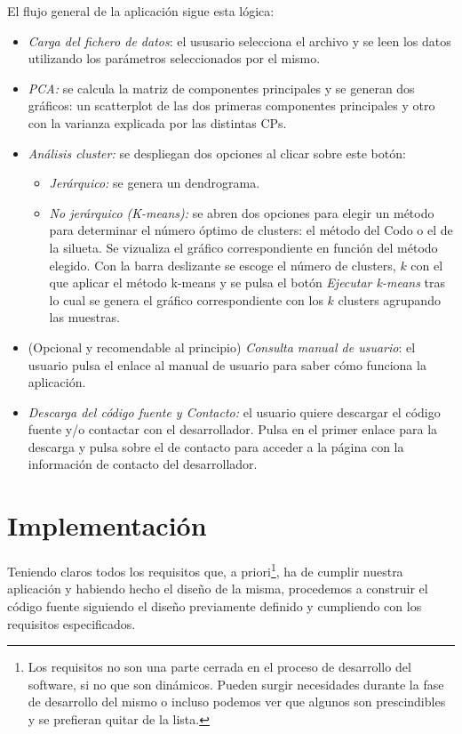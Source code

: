 El flujo general de la aplicación sigue esta lógica:

\begin{itemize}
    \item \textit{Carga del fichero de datos}: el ususario selecciona el archivo y se leen los datos utilizando los parámetros seleccionados por el mismo.
    \item \textit{PCA: } se calcula la matriz de componentes principales y se generan dos gráficos: un scatterplot de las dos primeras componentes principales y 
    otro con la varianza explicada por las distintas CPs.
    \item \textit{Análisis cluster:} se despliegan dos opciones al clicar sobre este botón:
    \begin{itemize}
        \item \textit{Jerárquico: } se genera un dendrograma.
        \item \textit{No jerárquico (K-means): } se abren dos opciones para elegir un método para determinar el número óptimo de clusters: el método del Codo o el
        de la silueta. Se vizualiza el gráfico correspondiente en función del método elegido.
        Con la barra deslizante se escoge el número de clusters, $k$ con el que aplicar el método k-means y se pulsa el botón \textit{Ejecutar k-means} tras
        lo cual se genera el gráfico correspondiente con los $k$ clusters agrupando las muestras.
    \end{itemize}
    \item (Opcional y recomendable al principio) \textit{Consulta manual de usuario}: el usuario pulsa el enlace al manual de usuario para saber cómo funciona la aplicación.
    \item \textit{Descarga del código fuente y Contacto:} el usuario quiere descargar el código fuente y/o contactar con el desarrollador. Pulsa en el primer enlace para la descarga
    y pulsa sobre el de contacto para acceder a la página con la información de contacto del desarrollador.
\end{itemize}


\section{Implementación}

Teniendo claros todos los requisitos que, a priori\footnote[1]{Los requisitos no son una parte cerrada en el proceso de desarrollo del software, si no que son dinámicos. Pueden surgir necesidades durante
la fase de desarrollo del mismo o incluso podemos ver que algunos son prescindibles y se prefieran quitar de la lista.}, ha de cumplir nuestra aplicación y habiendo hecho el diseño
de la misma, procedemos a construir el código fuente siguiendo el diseño previamente definido y cumpliendo con los requisitos especificados. \newline

